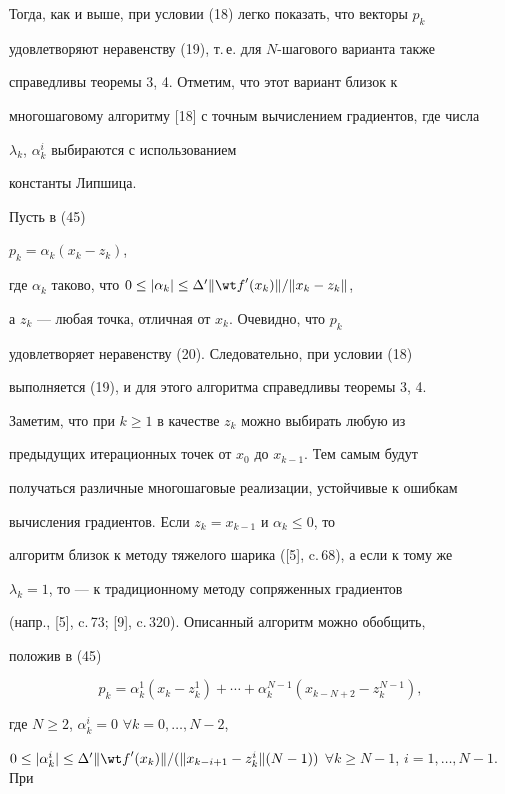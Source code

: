 Тогда, как и выше, при условии (18) легко показать, что векторы $p_k$


удовлетворяют неравенству (19), т.\,е. для $N$-шагового варианта также


справедливы теоремы 3, 4. Отметим, что этот вариант близок к


многошаговому алгоритму [18] с точным вычислением градиентов, где числа


$\lambda_k$, $\alpha_k^i$ выбираются с использованием


константы Липшица.





Пусть в (45)


$p_k=\alpha_k(x_k-z_k)$,


где $\alpha_k$ таково, что $0\le |{\alpha_k} |\le


{\Delta}'\|{{\wt f}'(x_k)}\|/\|{x_k-z_k} \|$,


а $z_k$ --- любая точка, отличная от $x_k$. Очевидно, что $p_k$


удовлетворяет неравенству (20). Следовательно, при условии (18)


выполняется (19), и для этого алгоритма справедливы теоремы 3, 4.


Заметим, что при $k\ge 1$ в качестве $z_k$ можно выбирать любую из


предыдущих итерационных точек от $x_0$ до $x_{k-1}$. Тем самым будут


получаться различные многошаговые реализации, устойчивые к ошибкам


вычисления градиентов. Если $z_k= x_{k-1}$ и $\alpha_k\le 0$, то


алгоритм близок к методу тяжелого шарика ([5], c.\,68), а если к тому же


$\lambda_k=1$, то --- к традиционному методу сопряженных градиентов


(напр., [5], c.\,73; [9], c.\,320). Описанный алгоритм можно обобщить,


положив в (45)


$$


p_k=\alpha_k^1(x_k-z_k^1)+\dotsb+\alpha_k^{N-1}(x_{k-N+2}-z_k^{N-1}),


$$


где $N\ge 2$, $\alpha_k^i=0$ $\forall k=0,\dotsc,N-2$,


$0\le|{\alpha_k^i}|\le{\Delta}'\|{{\wt f}'(x_k)}\|/(\|{x_{k-i+1}-z_k^i}


\|(N-1))$ $\forall k\ge N-1$, $i=1,\dotsc,N-1$. При


